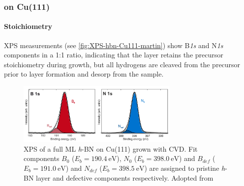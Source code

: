 \subsubsection{on Cu(111)}
%	

	\paragraph{Stoichiometry}
	XPS measurements (see \autoref{fig:XPS-hbn-Cu111-martin}) show B\textit{1s} and N\textit{1s} components in a 1:1 ratio, indicating that the layer retains the precursor stoichiometry during growth, but all hydrogens are cleaved from the precursor prior to layer formation and desorp from the sample.\cite{Zhang_Two-dimensional_2017}
	
\begin{figure} \centering
	\includegraphics[width=0.7\textwidth]{./images/XPS-hbn-Cu111-martin}%
	\caption{XPS of a full ML \textit{h}-BN on Cu(111) grown with CVD. Fit components $B_0$ ($E_b=\SI{190.4}{\eV}$), $N_0$ ($E_b=\SI{398.0}{\eV}$) and $B_{def}$ ($E_b=\SI{191.0}{\eV}$) and $N_{def}$ ($E_b=\SI{398.5}{\eV}$) are assigned to pristine \textit{h}-BN layer and defective components respectively. Adopted from \cite{schwarz_assembly_2018}}
	\label{fig:XPS-hbn-Cu111-martin}
\end{figure}



